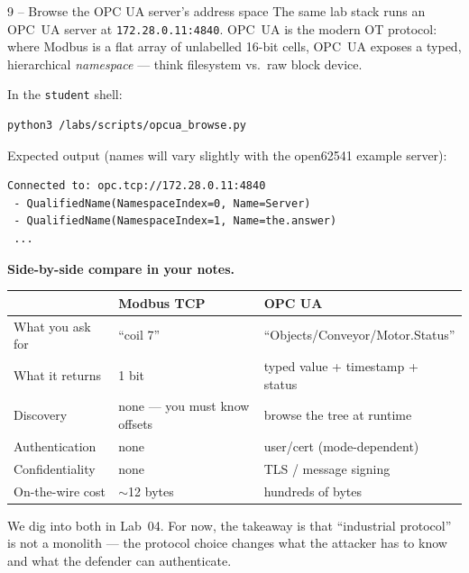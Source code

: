 \documentclass[11pt,a4paper]{article}
\begin{document}
\begin{stepbox}{9 -- Browse the OPC UA server's address space}
The same lab stack runs an OPC~UA server at \texttt{172.28.0.11:4840}. OPC~UA is the modern OT protocol: where Modbus is a flat array of unlabelled 16-bit cells, OPC~UA exposes a typed, hierarchical \emph{namespace} --- think filesystem vs.\ raw block device.

\smallskip
In the \texttt{student} shell:
\begin{lstlisting}[language=bash]
python3 /labs/scripts/opcua_browse.py
\end{lstlisting}
Expected output (names will vary slightly with the open62541 example server):
\begin{lstlisting}
Connected to: opc.tcp://172.28.0.11:4840
 - QualifiedName(NamespaceIndex=0, Name=Server)
 - QualifiedName(NamespaceIndex=1, Name=the.answer)
 ...
\end{lstlisting}

\smallskip\noindent\textbf{Side-by-side compare in your notes.}
\begin{center}
\footnotesize
\begin{tabular}{@{}lll@{}}
\toprule
                          & \textbf{Modbus TCP}             & \textbf{OPC UA} \\
\midrule
What you ask for          & ``coil 7''                      & ``Objects/Conveyor/Motor.Status'' \\
What it returns           & 1 bit                           & typed value + timestamp + status \\
Discovery                 & none --- you must know offsets  & browse the tree at runtime \\
Authentication            & none                            & user/cert (mode-dependent) \\
Confidentiality           & none                            & TLS / message signing \\
On-the-wire cost          & $\sim$12 bytes                  & hundreds of bytes \\
\bottomrule
\end{tabular}
\end{center}
We dig into both in Lab~04. For now, the takeaway is that ``industrial protocol'' is not a monolith --- the protocol choice changes what the attacker has to know and what the defender can authenticate.
\end{stepbox}

\end{document}
